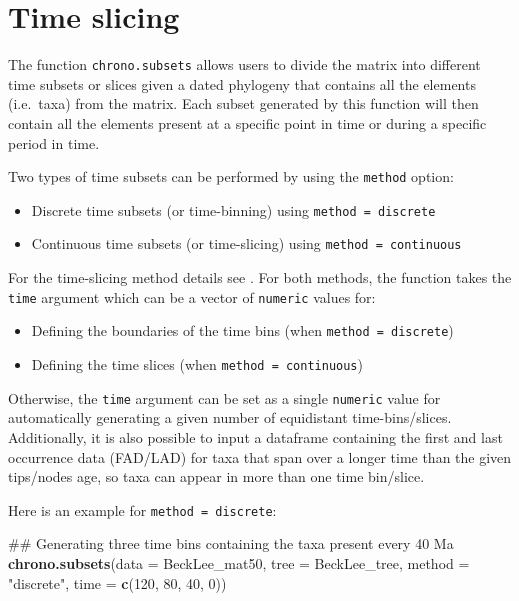 \documentclass[]{book}
\newenvironment{Shaded}{\begin{snugshade}}{\end{snugshade}}
\newcommand{\KeywordTok}[1]{\textcolor[rgb]{0.13,0.29,0.53}{\textbf{#1}}}
\newcommand{\DataTypeTok}[1]{\textcolor[rgb]{0.13,0.29,0.53}{#1}}
\newcommand{\DecValTok}[1]{\textcolor[rgb]{0.00,0.00,0.81}{#1}}
\newcommand{\StringTok}[1]{\textcolor[rgb]{0.31,0.60,0.02}{#1}}
\newcommand{\NormalTok}[1]{#1}
\providecommand{\tightlist}{%
  \setlength{\itemsep}{0pt}\setlength{\parskip}{0pt}}
\theoremstyle{definition}
\theoremstyle{definition}
\theoremstyle{definition}
\theoremstyle{remark}
\begin{document}
\hypertarget{time-slicing}{\section{Time slicing}\label{time-slicing}}

The function \texttt{chrono.subsets} allows users to divide the matrix
into different time subsets or slices given a dated phylogeny that
contains all the elements (i.e.~taxa) from the matrix. Each subset
generated by this function will then contain all the elements present at
a specific point in time or during a specific period in time.

Two types of time subsets can be performed by using the \texttt{method}
option:

\begin{itemize}
\tightlist
\item
  Discrete time subsets (or time-binning) using
  \texttt{method\ =\ discrete}
\item
  Continuous time subsets (or time-slicing) using
  \texttt{method\ =\ continuous}
\end{itemize}

For the time-slicing method details see \citet{time-slice}. For both
methods, the function takes the \texttt{time} argument which can be a
vector of \texttt{numeric} values for:

\begin{itemize}
\tightlist
\item
  Defining the boundaries of the time bins (when
  \texttt{method\ =\ discrete})
\item
  Defining the time slices (when \texttt{method\ =\ continuous})
\end{itemize}

Otherwise, the \texttt{time} argument can be set as a single
\texttt{numeric} value for automatically generating a given number of
equidistant time-bins/slices. Additionally, it is also possible to input
a dataframe containing the first and last occurrence data (FAD/LAD) for
taxa that span over a longer time than the given tips/nodes age, so taxa
can appear in more than one time bin/slice.

Here is an example for \texttt{method\ =\ discrete}:

\begin{Shaded}
\begin{Highlighting}[]
\NormalTok{## Generating three time bins containing the taxa present every 40 Ma}
\KeywordTok{chrono.subsets}\NormalTok{(}\DataTypeTok{data =}\NormalTok{ BeckLee_mat50, }\DataTypeTok{tree =}\NormalTok{ BeckLee_tree, }\DataTypeTok{method =} \StringTok{"discrete"}\NormalTok{,}
                \DataTypeTok{time =} \KeywordTok{c}\NormalTok{(}\DecValTok{120}\NormalTok{, }\DecValTok{80}\NormalTok{, }\DecValTok{40}\NormalTok{, }\DecValTok{0}\NormalTok{))}
\end{Highlighting}
\end{Shaded}
\end{document}
